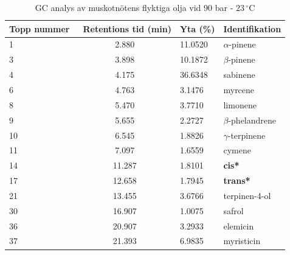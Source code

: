 \documentclass{theme/franska}
\begin{document}
\begin{table}[!htbp]
\small
\centering
\caption{GC analys av muskotnötens flyktiga olja vid 90 bar - $23\,^{\circ}\mathrm{C}$}
\begin{tabular*}{\textwidth}{l @{\extracolsep{\fill}} @{}cll@{}}
\toprule
Topp nummer & \ Retentions tid (min) & Yta (\%) & Identifikation                                      \\ \midrule
1           & 2.880                & 11.0520   & $\alpha$-pinene                                      \\
3           & 3.898                & 10.1872   & $\beta$-pinene                                       \\
4           & 4.175                & 36.6348   & sabinene                                            \\
6           & 4.763                & 3.1476    & myrcene                                             \\
8           & 5.470                & 3.7710    & limonene                                            \\
9           & 5.655                & 2.2727    & $\beta$-phelandrene                                  \\
10          & 6.545                & 1.8826    & $\gamma$-terpinene                                   \\
11          & 7.097                & 1.6559    & cymene                                              \\
14          & 11.287               & 1.8101    & \textbf{cis*}   \\
17          & 12.658               & 1.7945    & \textbf{trans*} \\
21          & 13.455               & 3.6766    & terpinen-4-ol                                       \\
30          & 16.907               & 1.0075    & safrol                                              \\
36          & 20.907               & 3.2933    & elemicin                                            \\
37          & 21.393               & 6.9835    & myristicin                                          \\ \bottomrule
\end{tabular*}

\end{table}
\end{document}
